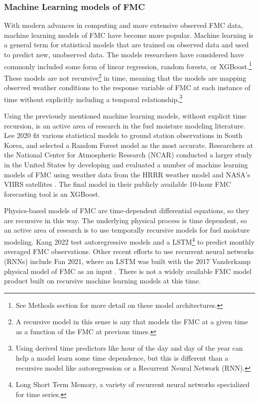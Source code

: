 \documentclass[11pt]{article}%
\begin{document}
\subsubsection{Machine Learning models of FMC}

With modern advances in computing and more extensive observed FMC data, machine learning models of FMC have become more popular. Machine learning is a general term for statistical models that are trained on observed data and used to predict new, unobserved data. The models researchers have considered have commonly included some form of linear regression, random forests, or XGBoost.\footnote{See Methods section for more detail on these model architectures.} These models are not recursive\footnote{A recursive model in this sense is any that models the FMC at a given time as a function of the FMC at previous times.} in time, meaning that the models are mapping observed weather conditions to the response variable of FMC at each instance of time without explicitly including a temporal relationship.\footnote{Using derived time predictors like hour of the day and day of the year can help a model learn some time dependence, but this is different than a recursive model like autoregression or a Recurrent Neural Network (RNN).} 


Using the previously mentioned machine learning models, without explicit time recursion, is an active area of research in the fuel moisture modeling literature. Lee 2020 fit various statistical models to ground station observations in South Korea, and selected a Random Forest model as the most accurate. \cite{Lee-2020-EFM} Researchers at the National Center for Atmospheric Research (NCAR) conducted a larger study in the United States by developing and evaluated a number of machine learning models of FMC using weather data from the HRRR weather model and NASA's VIIRS satellites \cite{McCandless-2020-EWS, Schreck-2023-MLV}. The final model in their publicly available 10-hour FMC forecasting tool is an XGBoost. 

Physics-based models of FMC are time-dependent differential equations, so they are recursive in this way. The underlying physical process is time dependent, so an active area of research is to use temporally recursive models for fuel moisture modeling. Kang 2022 test autoregressive models and a LSTM\footnote{Long Short Term Memory, a variety of recurrent neural networks specialized for time series.} to predict monthly averaged FMC observations. \cite{Kang-2022-FMC} Other recent efforts to use recurrent neural networks (RNNs) include Fan 2021, where an LSTM was built with the 2017 Vanderkamp physical model of FMC as an input \cite{Fan-2021-PGD}. There is not a widely available FMC model product built on recursive machine learning models at this time.
\end{document}
